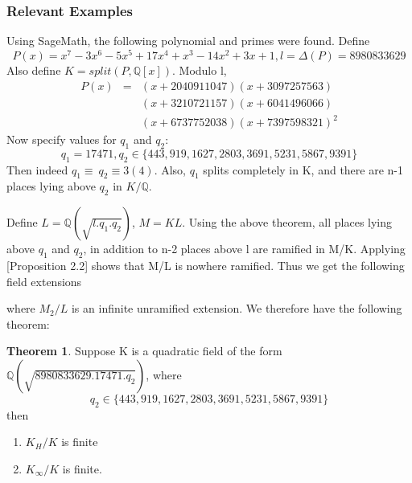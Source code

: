 \documentclass[12pt]{extarticle}
\newcommand{\<}{\langle}
\renewcommand{\>}{\rangle}
\theoremstyle{definition}
\newtheorem{theorem}{Theorem}
\begin{document}
\subsubsection*{Relevant Examples}
Using SageMath, the following polynomial and primes were found. Define 
\begin{equation}
    P(x) = x^7-3x^6-5x^5+17x^4+x^3-14x^2+3x+1, l=\Delta(P)=8980833629
\end{equation}
Also define $K=split(P,\mathbb{Q}[x])$. Modulo l,
\begin{eqnarray*}
        P(x)&=&(x+2040911047)(x+3097257563)\\ & & {} (x+3210721157)(x+6041496066)\\ & & {}(x+6737752038)(x+7397598321)^2
\end{eqnarray*}
Now specify values for $q_1$ and $q_2$:
\begin{equation}
    q_1=17471,q_2\in\{443,919,1627,2803,3691,5231,5867,9391\}
\end{equation}
Then indeed $q_1\equiv\:q_2\equiv3(4)$. Also, $q_1$ splits completely in K, and there are n-1 places lying above $q_2$ in $K/\mathbb{Q}$.
\par
Define $L=\mathbb{Q}(\sqrt{l.q_1.q_2})$, $M=KL$. Using the above theorem, all places lying above $q_1$ and $q_2$, in addition to n-2 places above l are ramified in M/K.  Applying \cite{MAIR}[Proposition 2.2] shows that M/L is nowhere ramified. Thus we get the following field extensions
\begin{center}
\end{center}
where $M_2/L$ is an infinite unramified extension. We therefore have the following theorem:
\begin{theorem}
    Suppose K is a quadratic field of the form $\mathbb{Q}(\sqrt{8980833629.17471.q_2})$, where 
    \begin{equation}
        q_2\in\{443,919,1627,2803,3691,5231,5867,9391\}
    \end{equation}
    then \begin{enumerate}
        \item $K_H/K$ is finite
        \item $K_\infty/K$ is finite.
    \end{enumerate}
\end{theorem}
\end{document}
